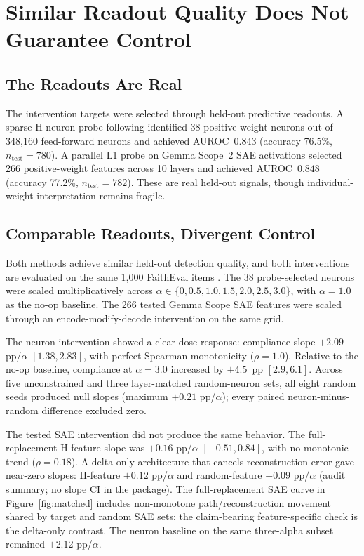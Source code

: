 \documentclass{article}
\begin{document}
\section{Similar Readout Quality Does Not Guarantee Control}
\label{sec:localization}

\subsection{The Readouts Are Real}

The intervention targets were selected through held-out predictive readouts.
A sparse H-neuron probe following \citet{gao2025hneurons} identified 38 positive-weight neurons out of 348,160 feed-forward neurons and achieved AUROC~$0.843$ (accuracy 76.5\%, $n_{\text{test}} = 780$).
A parallel L1 probe on Gemma Scope~2 SAE activations \citep{lieberum2024gemmascope} selected 266 positive-weight features across 10 layers and achieved AUROC~$0.848$ (accuracy 77.2\%, $n_{\text{test}} = 782$).
These are real held-out signals, though individual-weight interpretation remains fragile.

\subsection{Comparable Readouts, Divergent Control}

Both methods achieve similar held-out detection quality, and both interventions are evaluated on the same 1,000 FaithEval items \citep{ming2025faitheval}.
The 38 probe-selected neurons were scaled multiplicatively across $\alpha \in \{0, 0.5, 1.0, 1.5, 2.0, 2.5, 3.0\}$, with $\alpha = 1.0$ as the no-op baseline.
The 266 tested Gemma Scope SAE features were scaled through an encode-modify-decode intervention on the same grid.

The neuron intervention showed a clear dose-response: compliance slope $+2.09$ pp/$\alpha$ $[1.38, 2.83]$, with perfect Spearman monotonicity ($\rho = 1.0$).
Relative to the no-op baseline, compliance at $\alpha = 3.0$ increased by $+4.5$~pp $[2.9, 6.1]$.
Across five unconstrained and three layer-matched random-neuron sets, all eight random seeds produced null slopes (maximum $+0.21$ pp/$\alpha$); every paired neuron-minus-random difference excluded zero.

The tested SAE intervention did not produce the same behavior.
The full-replacement H-feature slope was $+0.16$ pp/$\alpha$ $[-0.51, 0.84]$, with no monotonic trend ($\rho = 0.18$).
A delta-only architecture that cancels reconstruction error gave near-zero slopes: H-feature $+0.12$ pp/$\alpha$ and random-feature $-0.09$ pp/$\alpha$ (audit summary; no slope CI in the package).
The full-replacement SAE curve in Figure~\ref{fig:matched} includes non-monotone path/reconstruction movement shared by target and random SAE sets; the claim-bearing feature-specific check is the delta-only contrast.
The neuron baseline on the same three-alpha subset remained $+2.12$ pp/$\alpha$.
\end{document}
